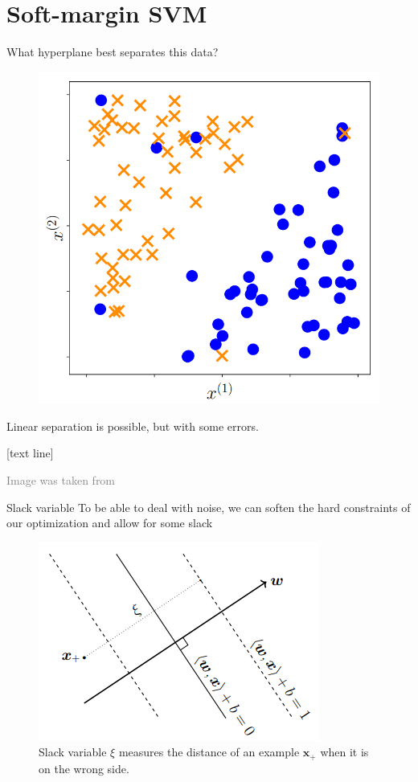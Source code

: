 \documentclass[dvipsnames]{beamer}
\newcommand{\referencefootnote}[1]{\setbeamertemplate{footline}[text line]{%
\parbox{0.9\paperwidth}{\vspace*{-23pt}\tiny{\textcolor{gray}{#1}}\hfill\scriptsize\insertframenumber}}}
\begin{document}
		\section{Soft-margin SVM}
			\begin{frame}{What hyperplane best separates this data?}
			  \begin{figure}
					\center
					\includegraphics[scale=.25]{figures/binary3.png}
        \end{figure} \pause
				Linear separation is possible, but with some errors.
			\end{frame}

{ \referencefootnote{Image was taken from \cite{deisenroth_faisal_ong_2020}}
			\begin{frame}{Slack variable}
			To be able to deal with noise, we can soften the hard constraints of our optimization and allow for some slack
			  \begin{figure}
					\center
					\includegraphics[scale=.45]{figures/slack.png}
           \caption{Slack variable $\xi$ measures the distance of an example $\mathbf{x}_+$ when it is on the wrong side.}
        \end{figure}
			\end{frame}
			}
			
\end{document}
